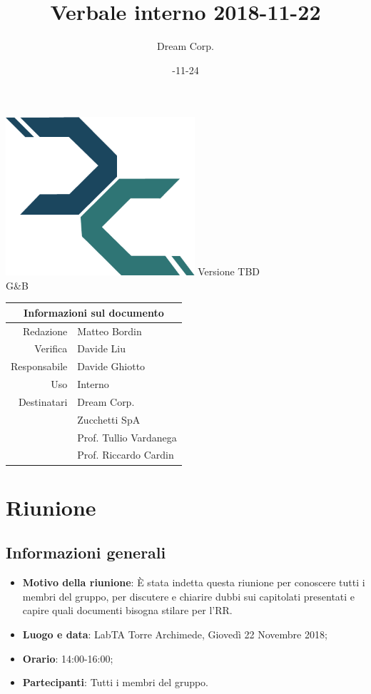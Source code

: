 \documentclass[12pt]{article}
\title{\myfont Verbale interno 2018-11-22}
\author{Dream Corp.}
\date{\myfont 2018-11-24}
\newcommand{\version}{Versione TBD}
\begin{document}
	\maketitle
	\begin{center}
		\includegraphics[width = 70mm]{logo.png}\newline
		\huge \version 
		\\G\&B
		
		\begin{table}[h!]
			\centering
			\begin{tabular}{r|l}
					\multicolumn{2}{c}{Informazioni sul documento}\\
			        \hline
        			Redazione & Matteo Bordin\\
        			Verifica & Davide Liu\\
        			Responsabile & Davide Ghiotto\\
        			Uso & Interno\\
        			Destinatari & Dream Corp. \\
        			& Zucchetti SpA\\
        			& Prof. Tullio Vardanega\\
        			& Prof. Riccardo Cardin\\
			\end{tabular}
		\end{table}
		
\end{center}


\section{Riunione}
    \subsection{Informazioni generali}
    \begin{itemize}
        \item \textbf{Motivo della riunione}: È stata indetta questa riunione per conoscere tutti i membri del gruppo, per discutere e chiarire dubbi sui capitolati presentati e capire quali documenti bisogna stilare per l'RR.
        \item \textbf{Luogo e data}: LabTA Torre Archimede, Giovedì 22 Novembre 2018;
        \item \textbf{Orario}: 14:00-16:00;
        \item \textbf{Partecipanti}: Tutti i membri del gruppo.

    \end{itemize}
    \newpage
\end{document}
